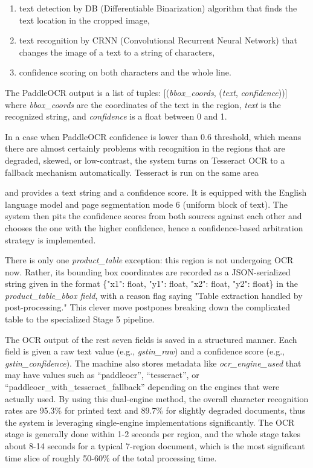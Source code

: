 \documentclass[conference,twocolumn]{IEEEtran}
\begin{document}
\begin{enumerate}
\def\labelenumi{\arabic{enumi}.}
\item
  text detection by DB (Differentiable Binarization) algorithm that
  finds the text location in the cropped image,
\item
  text recognition by CRNN (Convolutional Recurrent Neural Network) that
  changes the image of a text to a string of characters,
\item
  confidence scoring on both characters and the whole line.
\end{enumerate}

The PaddleOCR output is a list of tuples: {[}(\textit{bbox\_coords},
(\textit{text}, \textit{confidence})){]} where \textit{bbox\_coords} are the
coordinates of the text in the region, \textit{text} is the recognized
string, and \textit{confidence} is a float between 0 and 1.

In a case when PaddleOCR confidence is lower than 0.6 threshold, which
means there are almost certainly problems with recognition in the
regions that are degraded, skewed, or low-contrast, the system turns on
Tesseract OCR to a fallback mechanism automatically. Tesseract is run on
the same area

and provides a text string and a confidence score. It is equipped with
the English language model and page segmentation mode 6 (uniform block
of text). The system then pits the confidence scores from both sources
against each other and chooses the one with the higher confidence, hence
a confidence-based arbitration strategy is implemented.

There is only one \textit{product\_table} exception: this region is not
undergoing OCR now. Rather, its bounding box coordinates are recorded as
a JSON-serialized string given in the format \{"x1": float, "y1": float,
"x2": float, "y2": float\} in the \textit{product\_table\_bbox field},
with a reason flag saying "Table extraction handled by post-processing."
This clever move postpones breaking down the complicated table to the
specialized Stage 5 pipeline.

The OCR output of the rest seven fields is saved in a structured manner.
Each field is given a raw text value (e.g., \textit{gstin\_raw}) and a
confidence score (e.g., \textit{gstin\_confidence}). The machine also
stores metadata like \textit{ocr\_engine\_used} that may have values such
as ``paddleocr'',
``tesseract'', or
``paddleocr\_with\_tesseract\_fallback''
depending on the engines that were actually used. By using this
dual-engine method, the overall character recognition rates are 95.3\%
for printed text and 89.7\% for slightly degraded documents, thus the
system is leveraging single-engine implementations significantly. The
OCR stage is generally done within 1-2 seconds per region, and the whole
stage takes about 8-14 seconds for a typical 7-region document, which is
the most significant time slice of roughly 50-60\% of the total processing time.
\end{document}
